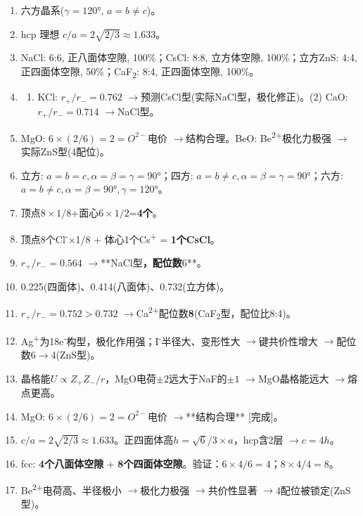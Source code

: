 \documentclass[a4paper,11pt]{ctexart}
\providecommand{\tightlist}{\setlength{\itemsep}{0pt}\setlength{\parskip}{0pt}}
\newcommand{\箭}{\ensuremath{\rightarrow}}
\newcommand{\左箭}{\ensuremath{\leftarrow}}
\newcommand{\上箭}{\ensuremath{\uparrow}}
\newcommand{\下箭}{\ensuremath{\downarrow}}
\newcommand{\衡}{\ensuremath{\rightleftharpoons}}
\newcommand{\双箭}{\ensuremath{\leftrightarrow}}
\newcommand{\约等于}{\ensuremath{\approx}}
\newcommand{\小于等于}{\ensuremath{\leq}}
\newcommand{\大于等于}{\ensuremath{\geq}}
\newcommand{\不等于}{\ensuremath{\neq}}
\newcommand{\西格马}{\ensuremath{\sigma}}
\newcommand{\派}{\ensuremath{\pi}}
\begin{document}
\begin{enumerate}
\def\labelenumi{\arabic{enumi}.}
\item
  六方晶系(\(\gamma=120°\), \(a=b\neq c\))。
\item
  hcp 理想 \(c/a = 2\sqrt{2/3} \approx 1.633\)。
\item
  NaCl: 6:6, 正八面体空隙, 100\%；CsCl: 8:8, 立方体空隙, 100\%；立方ZnS: 4:4, 正四面体空隙, 50\%；CaF\textsubscript{2}: 8:4, 正四面体空隙, 100\%。
\item
  \begin{enumerate}
  \def\labelenumii{(\arabic{enumii})}
  \tightlist
  \item
    KCl: \(r_+/r_-=0.762\) \箭 预测CsCl型(实际NaCl型，极化修正)。(2) CaO: \(r_+/r_-=0.714\) \箭 NaCl型。
  \end{enumerate}
\item
  MgO: \(6\times(2/6)=2=O^{2-}\)电价 \箭 结构合理。BeO: Be\textsuperscript{2+}极化力极强 \箭 实际ZnS型(4配位)。
\item
  立方: \(a=b=c,\alpha=\beta=\gamma=90°\)；四方: \(a=b\neq c,\alpha=\beta=\gamma=90°\)；六方: \(a=b\neq c,\alpha=\beta=90°,\gamma=120°\)。
\item
  顶点\(8\times1/8\)+面心\(6\times1/2\)=\textbf{4个}。
\item
  顶点8个Cl\textsuperscript{-}×1/8 + 体心1个Cs\textsuperscript{+} = \textbf{1个CsCl}。
\item
  \(r_+/r_-=0.564\) \箭 **NaCl型\textbf{，配位数}6**。
\item
  0.225(四面体)、0.414(八面体)、0.732(立方体)。
\item
  \(r_+/r_-=0.752>0.732\) \箭 Ca\textsuperscript{2+}配位数\textbf{8}(CaF\textsubscript{2}型，配位比8:4)。
\item
  Ag\textsuperscript{+}为18e\textsuperscript{-}构型，极化作用强；I\textsuperscript{-}半径大、变形性大 \箭 键共价性增大 \箭 配位数6\箭4(ZnS型)。
\item
  晶格能\(U\propto Z_+Z_-/r\)，MgO电荷\(\pm2\)远大于NaF的\(\pm1\) \箭 MgO晶格能远大 \箭 熔点更高。
\item
  MgO: \(6\times(2/6)=2=O^{2-}\)电价 \箭 **结构合理** {[}完成{]}。
\item
  \(c/a=2\sqrt{2/3}\approx1.633\)。正四面体高\(h=\sqrt{6}/3\times a\)，hcp含2层 \箭 \(c=4h\)。
\item
  fcc: \textbf{4个八面体空隙} + \textbf{8个四面体空隙}。验证：\(6\times4/6=4\)；\(8\times4/4=8\)。
\item
  Be\textsuperscript{2+}电荷高、半径极小 \箭 极化力极强 \箭 共价性显著 \箭 4配位被锁定(ZnS型)。

\end{enumerate}
\end{document}
